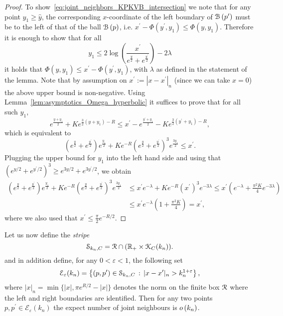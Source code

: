 \begin{proof}
To show~\eqref{eq:joint_neighbors_KPKVB_intersection} we note that for any point $y_1 \ge \hat{y}$, the corresponding $x$-coordinate of the left boundary of ${\mathcal B}\left(p^\prime\right)$ must be to the left of that of the ball ${\mathcal B}\left(p\right)$, i.e.
$x^\prime - \Phi(y^\prime, y_1) \le \Phi(y,y_1)$. Therefore it is enough to show that for all 
\[
	y_1 \le 2 \log\left(\frac{x^\prime}{e^{\frac{y}{2}} + e^{\frac{y^\prime}{2}}}\right) - 2\lambda
\]
it holds that $\Phi(y,y_1) \le x^\prime - \Phi(y^\prime, y_1)$, with $\lambda$ as defined in the statement of the lemma. Note that by assumption on $x^\prime := |x - x^\prime|_n$ (since we can take $x = 0$) the above upper bound is non-negative. Using Lemma~\ref{lem:asymptotics_Omega_hyperbolic} it suffices to prove that for all such $y_1$,
\[
	e^{\frac{y + y_1}{2}} + K e^{\frac{3}{2}(y + y_1) - R} \le x^\prime - e^{\frac{y^\prime + y_1}{2}}
	- K e^{\frac{3}{2}(y^\prime + y_1) - R},
\]
which is equivalent to
\[
	\left(e^{\frac{y}{2}} + e^{\frac{y^\prime}{2}}\right) e^{\frac{y_1}{2}} 
	+ K e^{-R} \left(e^{\frac{y}{2}} + e^{\frac{y^\prime}{2}}\right)^3 e^{\frac{3 y_1}{2}} \le x^\prime.
\]
Plugging the upper bound for $y_1$ into the left hand side and using that $(e^{y/2} + e^{y^\prime/2})^3 \ge e^{3y/2} + e^{3y^\prime/2}$, we obtain
\begin{align*}
	\left(e^{\frac{y}{2}} + e^{\frac{y^\prime}{2}}\right) e^{\frac{y_1}{2}} 
		+ K e^{-R} \left(e^{\frac{y}{2}} + e^{\frac{y^\prime}{2}}\right)^3 e^{\frac{3 y_1}{2}}
	&\le x^\prime e^{-\lambda} + K e^{-R} (x^\prime)^3 e^{-3\lambda}
		\le x^\prime \left(e^{-\lambda} + \frac{\pi^2 K}{4} e^{-3\lambda}\right)\\
	&\le x^\prime e^{-\lambda} \left(1 + \frac{\pi^2 K}{4}\right) = x^\prime,
\end{align*} 
where we also used that $x^\prime \le \frac{\pi}{2} e^{-R/2}$.
\end{proof}

Let us now define the \emph{stripe}
\begin{equation}\label{eq:def_stripe}
	\mathcal{S}_{k_n,C} = {\mathcal R} \cap ({\mathbb R}_+ \times {\mathcal K}_C(k_n)).
\end{equation} 
and in addition define, for any $0 < \varepsilon < 1$, the following set
\begin{equation}\label{eq:def_joint_degree_set_E_growing_k}
	\mathcal{E}_{\varepsilon}(k_n) = \left\{(p,p^\prime) \in \mathcal{S}_{k_n,C}
		\, : \,  |x - x^\prime|_n > k_n^{1 + \varepsilon} \right\}, 
\end{equation}
where $|x|_n = \min\{|x|, \pi e^{R/2} - |x|\}$ denotes the norm on the finite box ${\mathcal R}$ where the left and right boundaries are identified. Then for any two points $p,p^\prime \in \mathcal{E}_\varepsilon(k_n)$ the expect number of joint neighbours is $o\left(k_n\right)$.

